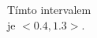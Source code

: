 \documentclass[preview]{standalone}
\begin{document}
\begin{center}
Tímto intervalem\\ je  $<0.4,1.3>$.
\end{center}
\end{document}

